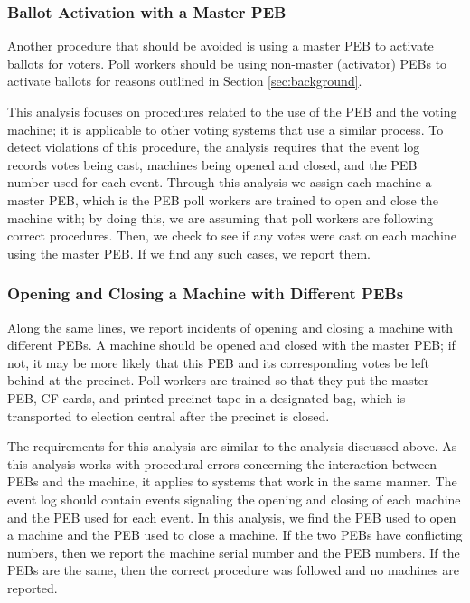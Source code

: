 \subsubsection{Ballot Activation with a Master PEB}
Another procedure that should be avoided is using a master PEB to activate ballots for voters.  Poll workers should be using non-master (activator) PEBs to activate ballots for reasons outlined in Section \ref{sec:background}.

This analysis focuses on procedures related to the use of the PEB and the voting machine; it is applicable to other voting systems that use a similar process.  To detect violations of this procedure, the analysis requires that the event log records votes being cast, machines being opened and closed, and the PEB number used for each event.  Through this analysis we assign each machine a master PEB, which is the PEB poll workers are trained to open and close the machine with; by doing this, we are assuming that poll workers are following correct procedures.  Then, we check to see if any votes were cast on each machine using the master PEB.  If we find any such cases, we report them.  

\subsubsection{Opening and Closing a Machine with Different PEBs}
Along the same lines, we report incidents of opening and closing a machine with different PEBs. A machine should be opened and closed with the master PEB; if not, it may be more likely that this PEB and its corresponding votes be left behind at the precinct.  Poll workers are trained so that they put the master PEB, CF cards, and printed precinct tape in a designated bag, which is transported to election central after the precinct is closed.  

The requirements for this analysis are similar to the analysis discussed above.  As this analysis works with procedural errors concerning the interaction between PEBs and the machine, it applies to systems that work in the same manner.  The event log should contain events signaling the opening and closing of each machine and the PEB used for each event.  In this analysis, we find the PEB used to open a machine and the PEB used to close a machine.  If the two PEBs have conflicting numbers, then we report the machine serial number and the PEB numbers.  If the PEBs are the same, then the correct procedure was followed and no machines are reported.  

